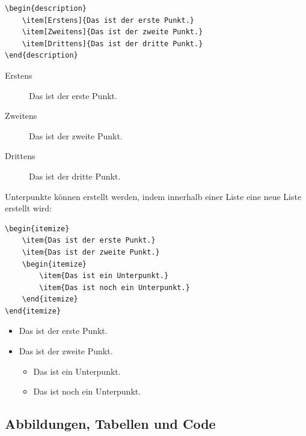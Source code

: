
\begin{verbatim}
\begin{description}
    \item[Erstens]{Das ist der erste Punkt.}
    \item[Zweitens]{Das ist der zweite Punkt.}
    \item[Drittens]{Das ist der dritte Punkt.}
\end{description}
\end{verbatim}

\begin{description}
    \item[Erstens]{Das ist der erste Punkt.}
    \item[Zweitens]{Das ist der zweite Punkt.}
    \item[Drittens]{Das ist der dritte Punkt.}
\end{description}

\noindent Unterpunkte können erstellt werden, indem innerhalb einer Liste eine neue Liste erstellt wird:

\begin{verbatim}
\begin{itemize}
    \item{Das ist der erste Punkt.}
    \item{Das ist der zweite Punkt.}
    \begin{itemize}
        \item{Das ist ein Unterpunkt.}
        \item{Das ist noch ein Unterpunkt.}
    \end{itemize}
\end{itemize}
\end{verbatim}

\begin{itemize}
    \item{Das ist der erste Punkt.}
    \item{Das ist der zweite Punkt.}
    \begin{itemize}
        \item{Das ist ein Unterpunkt.}
        \item{Das ist noch ein Unterpunkt.}
    \end{itemize}
\end{itemize}

\subsection{Abbildungen, Tabellen und Code}

